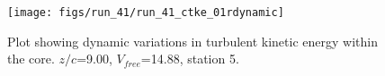 \begin{figure}[H]
\centering
\texttt{[image: figs/run\_41/run\_41\_ctke\_01rdynamic]}
\caption{Plot showing dynamic variations in turbulent kinetic energy within the core. $z/c$=9.00, $V_{free}$=14.88, station 5.}
\label{fig:run_41_ctke_01rdynamic}
\end{figure}


